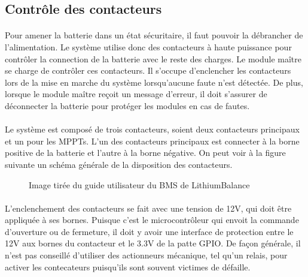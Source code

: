 
\subsection{Contrôle des contacteurs}

	\paragraph*{}
	Pour amener la batterie dans un état sécuritaire, il faut pouvoir la débrancher de l'alimentation. Le système utilise donc des contacteurs à haute puissance pour contrôler la connection de la batterie avec le reste des charges. Le module maître se charge de contrôler ces contacteurs. Il s'occupe d'enclencher les contacteurs lors de la mise en marche du système lorsqu'aucune faute n'est détectée. De plus, lorsque le module maître reçoit un message d'erreur, il doit s'assurer de déconnecter la batterie pour protéger les modules en cas de fautes.

	\paragraph*{}
	Le système est composé de trois contacteurs, soient deux contacteurs principaux et un pour les MPPTs. L'un des contacteurs principaux est connecter à la borne positive de la batterie et l'autre à la borne négative. On peut voir à la figure suivante un schéma générale de la disposition des contacteurs. 
	
	\begin{figure}[H]
		\centering
		\caption[Diagramme général des contacteurs]{Image tirée du guide utilisateur du BMS de LithiumBalance}
		\label{fig:lithiumbalancecontactordiagram}
	\end{figure}

	\paragraph*{}
	L'enclenchement des contacteurs se fait avec une tension de 12V, qui doit être appliquée à ses bornes. Puisque c'est le microcontrôleur qui envoit la commande d'ouverture ou de fermeture, il doit y avoir une interface de protection entre le 12V aux bornes du contacteur et le 3.3V de la patte GPIO. De façon générale, il n'est pas conseillé d'utiliser des actionneurs mécanique, tel qu'un relais, pour activer les contecateurs puisqu'ils sont souvent victimes de défaille. 	 

